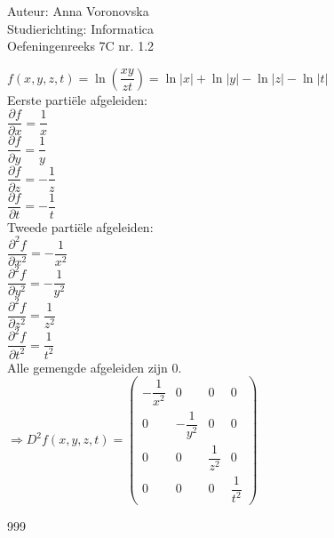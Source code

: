 \documentclass[a4paper]{article}
\begin{document}
  
\noindent \large Auteur: Anna Voronovska \\
\noindent \large Studierichting: Informatica\\
\noindent \large Oefeningenreeks 7C nr. 1.2\\

\medskip

\normalsize

$f(x,y,z,t) = \ln\left(\dfrac{xy}{zt}\right) = \ln|x| + \ln|y| - \ln|z| - \ln|t|$\\

Eerste partiële afgeleiden:\\

$\dfrac{\partial f}{\partial x} = \dfrac{1}{x}$\\

$\dfrac{\partial f}{\partial y} = \dfrac{1}{y}$\\

$\dfrac{\partial f}{\partial z} = -\dfrac{1}{z}$\\

$\dfrac{\partial f}{\partial t} = -\dfrac{1}{t}$\\

Tweede partiële afgeleiden:\\

$\dfrac{\partial^2 f}{\partial x^2} = -\dfrac{1}{x^2}$\\

$\dfrac{\partial^2 f}{\partial y^2} = -\dfrac{1}{y^2}$\\

$\dfrac{\partial^2 f}{\partial z^2} =\dfrac{1}{z^2}$\\

$\dfrac{\partial^2 f}{\partial t^2} =\dfrac{1}{t^2}$\\

Alle gemengde afgeleiden zijn $0$.\\

$\Rightarrow D^2f(x,y,z,t) = \left(\begin{array}{cccc}
-\dfrac{1}{x^2}&    0          &0             &0 \\
0              &-\dfrac{1}{y^2}&0             &0 \\
0              &0              &\dfrac{1}{z^2}&0 \\
0              &0              &0             &\dfrac{1}{t^2}
\end{array}\right)$\\


\begin{thebibliography}{999}
\end{thebibliography}
\end{document}
